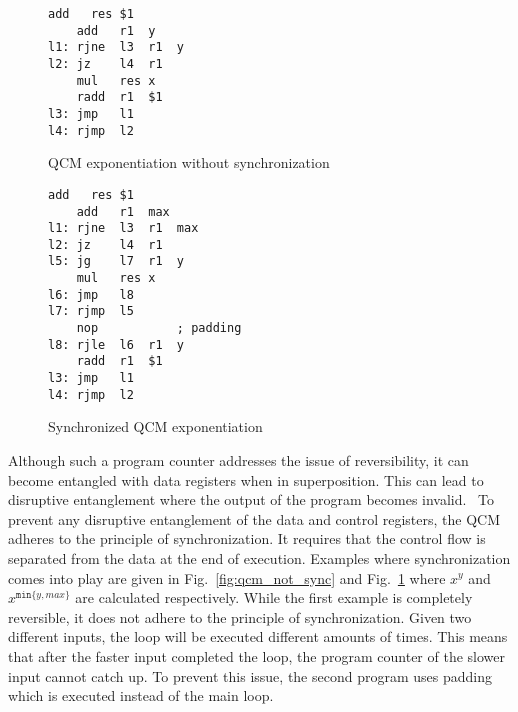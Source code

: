 \begin{figure}[htp]
    \centering     
    \begin{minipage}{.40\textwidth}
        \vspace{7.5em}
        \begin{lstlisting}[linewidth=17em,style=QCM]
    add   res $1
    add   r1  y
l1: rjne  l3  r1  y
l2: jz    l4  r1
    mul   res x
    radd  r1  $1
l3: jmp   l1  
l4: rjmp  l2      
        \end{lstlisting}
        \caption{QCM exponentiation without synchronization}
        \label{fig:qcm_not_sync}
    \end{minipage}
    \hfill
    \begin{minipage}{.55\textwidth}
        \begin{lstlisting}[linewidth=23em,style=QCM]
    add   res $1
    add   r1  max
l1: rjne  l3  r1  max
l2: jz    l4  r1
l5: jg    l7  r1  y   
    mul   res x
l6: jmp   l8  
l7: rjmp  l5
    nop           ; padding
l8: rjle  l6  r1  y
    radd  r1  $1
l3: jmp   l1
l4: rjmp  l2
        \end{lstlisting}
        \caption{Synchronized QCM exponentiation}    
        \label{fig:qcm_sync}
    \end{minipage}
\end{figure}

Although such a program counter addresses the issue of reversibility, it can become entangled with data registers when in superposition. This can lead to disruptive entanglement where the output of the program becomes invalid.~\cite{YVC24} To prevent any disruptive entanglement of the data and control registers, the QCM adheres to the principle of synchronization. 
It requires that the control flow is separated from the data at the end of execution. 
Examples where synchronization comes into play are given in Fig.~\ref{fig:qcm_not_sync} and Fig.~\ref{fig:qcm_sync} where $x^y$ and $x^{\texttt{min}\{y, max\}}$ are calculated respectively. 
While the first example is completely reversible, it does not adhere to the principle of synchronization. Given two different inputs, the loop will be executed different amounts of times. This means that after the faster input completed the loop, the program counter of the slower input cannot catch up. To prevent this issue, the second program uses padding which is executed instead of the main loop. 


